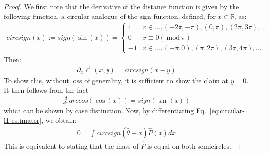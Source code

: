 \begin{proof}
We first note that the derivative of the distance function is given by the following function, a circular analogue of the sign function, defined, for $x \in \mathbb{R}$, as:
\begin{align*}
    circsign(x) := sign(\sin(x)) = \begin{cases} 1 & x \in \dots, (-2\pi, -\pi), (0,\pi), (2\pi, 3\pi), \dots \\
    0 & x \equiv 0 (\operatorname{mod} \pi) \\
    -1 & x \in \dots, (-\pi, 0), (\pi, 2\pi), (3\pi, 4\pi), \dots
    \end{cases}
\end{align*}
Then:
\begin{align*}
    \partial_x \ell^1(x,y) = circsign(x-y)
    \end{align*}
To show this, without loss of generality, it is sufficient to show the claim at $y=0$. It then follows from the fact
\begin{align*}
    \frac{d}{dx} arccos(\cos(x)) = sign(\sin(x))
    \end{align*}
which can be shown by case distinction. Now, by differentiating Eq.~\ref{eq:circular-l1-estimator}, we obtain:
\begin{align*}
    0 =  \int circsign(\widehat{\theta}-x) \widehat{P}(x) dx 
\end{align*}
This is equivalent to stating that the mass of $\widehat{P}$ is equal on both semicircles.
\end{proof}







